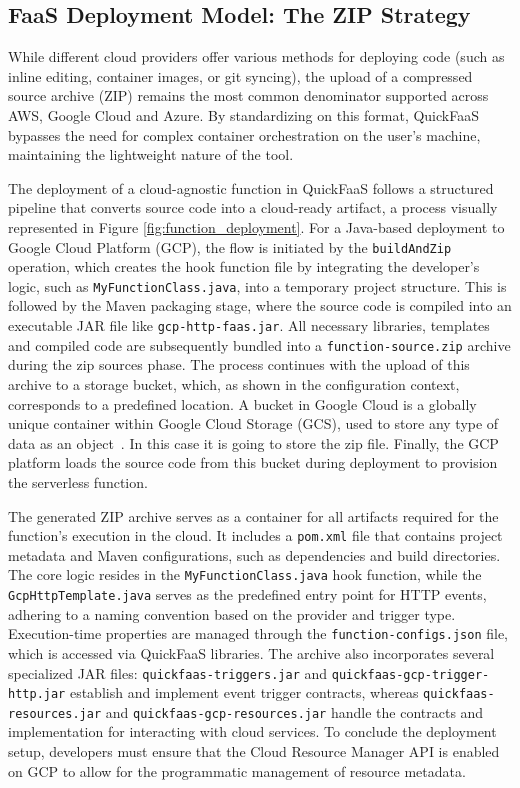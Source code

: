 \subsection{FaaS Deployment Model: The ZIP Strategy}
While different cloud providers offer various methods for deploying code (such as inline editing, container images, or git syncing), the upload of a compressed source archive (ZIP) remains the most common denominator supported across AWS, Google Cloud and Azure. By standardizing on this format, QuickFaaS bypasses the need for complex container orchestration on the user's machine, maintaining the lightweight nature of the tool.

The deployment of a cloud-agnostic function in QuickFaaS follows a structured pipeline that converts source code into a cloud-ready artifact, a process visually represented in Figure \ref{fig:function_deployment}. For a Java-based deployment to Google Cloud Platform (GCP), the flow is initiated by the \texttt{buildAndZip} operation, which creates the hook function file by integrating the developer's logic, such as \texttt{MyFunctionClass.java}, into a temporary project structure. This is followed by the Maven packaging stage, where the source code is compiled into an executable JAR file like \texttt{gcp-http-faas.jar}. All necessary libraries, templates and compiled code are subsequently bundled into a \texttt{function-source.zip} archive during the zip sources phase. The process continues with the upload of this archive to a storage bucket, which, as shown in the configuration context, corresponds to a predefined location. A bucket in Google Cloud is a globally unique container within Google Cloud Storage (GCS), used to store any type of data as an object~\cite{GCP_bucket}. In this case it is going to store the zip file. Finally, the GCP platform loads the source code from this bucket during deployment to provision the serverless function.

The generated ZIP archive serves as a container for all artifacts required for the function's execution in the cloud. It includes a \texttt{pom.xml} file that contains project metadata and Maven configurations, such as dependencies and build directories. The core logic resides in the \texttt{MyFunctionClass.java} hook function, while the \texttt{GcpHttpTemplate.java} serves as the predefined entry point for HTTP events, adhering to a naming convention based on the provider and trigger type. Execution-time properties are managed through the \texttt{function-configs.json} file, which is accessed via QuickFaaS libraries. The archive also incorporates several specialized JAR files: \texttt{quickfaas-triggers.jar} and \texttt{quickfaas-gcp-trigger-http.jar} establish and implement event trigger contracts, whereas \texttt{quickfaas-resources.jar} and \texttt{quickfaas-gcp-resources.jar} handle the contracts and implementation for interacting with cloud services. To conclude the deployment setup, developers must ensure that the Cloud Resource Manager API is enabled on GCP to allow for the programmatic management of resource metadata.

